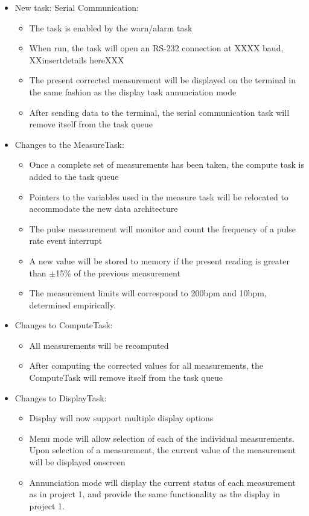 \documentclass[12pt]{article} %
\begin{document}
\begin{itemize}
  \item New task: Serial Communication:
    \begin{itemize}
      \item The task is enabled by the warn/alarm task
      \item When run, the task will open an RS-232 connection at XXXX baud,
	XXinsertdetails hereXXX
      \item The present corrected measurement will be displayed on the terminal
	in the same fashion as the display task annunciation mode
      \item After sending data to the terminal, the serial communication task
	will remove itself from the task queue
    \end{itemize}

  \item Changes to the MeasureTask:
    \begin{itemize}
      \item Once a complete set of measurements has been taken, the compute
	task is added to the task queue
      \item Pointers to the variables used in the measure task will be
	relocated to accommodate the new data architecture
      \item The pulse measurement will monitor and count the frequency of a
	pulse rate event interrupt
      \item A new value will be stored to memory if the present reading is
	greater than $\pm$15\% of the previous measurement
      \item The measurement limits will correspond to 200bpm and 10bpm,
	determined empirically. 
    \end{itemize}

  \item Changes to ComputeTask:
    \begin{itemize}
      \item All measurements will be recomputed
      \item After computing the corrected values for all measurements, the
	ComputeTask will remove itself from the task queue
    \end{itemize}

  \item Changes to DisplayTask:
    \begin{itemize}
      \item Display will now support multiple display options
      \item Menu mode will allow selection of each of the individual
	measurements. Upon selection of a measurement, the current value of the
	measurement will be displayed onscreen
      \item Annunciation mode will display the current status of each
	measurement as in project 1, and provide the same functionality as the
	display in project 1.
    \end{itemize}


\end{itemize}
\end{document}
